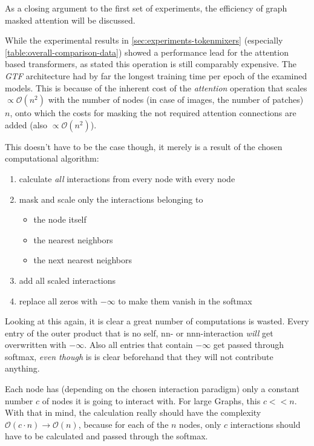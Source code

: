 As a closing argument to the first set of experiments, the efficiency of graph masked attention will be discussed.

While the experimental results in \autoref{sec:experiments-tokenmixers} (especially \autoref{table:overall-comparison-data}) showed a performance lead for the attention based transformers, as stated this operation is still comparably expensive.
The \emph{GTF} architecture had by far the longest training time per epoch of the examined models.
This is because of the inherent cost of the \emph{attention} operation that scales $\propto \mathcal{O}(n^2)$ with the number of nodes (in case of images, the number of patches) $n$, onto which the costs for masking the not required attention connections are added (also $\propto \mathcal{O}(n^2)$).

This doesn't have to be the case though, it merely is a result of the chosen computational algorithm: 
\begin{enumerate}
    \setlength\itemsep{-0.5em}
    \item calculate \emph{all} interactions from every node with every node
    \item mask and scale only the interactions belonging to 
        \begin{itemize}
            \setlength\itemsep{-0.5em}
            \item the node itself
            \item the nearest neighbors
            \item the next nearest neighbors
        \end{itemize}
    \item add all scaled interactions
    \item replace all zeros with $-\infty$ to make them vanish in the softmax
\end{enumerate}

Looking at this again, it is clear a great number of computations is wasted. 
Every entry of the outer product that is no self, nn- or nnn-interaction \emph{will} get overwritten with $-\infty$.
Also all entries that contain $-\infty$ get passed through softmax, \emph{even though} is is clear beforehand that they will not contribute anything.

Each node has (depending on the chosen interaction paradigm) only a constant number $c$ of nodes it is going to interact with.
For large Graphs, this $c << n$. 
With that in mind, the calculation really should have the complexity $\mathcal{O}(c \cdot n) \rightarrow \mathcal{O}(n)$, because for each of the $n$ nodes, only $c$ interactions should have to be calculated and passed through the softmax.


